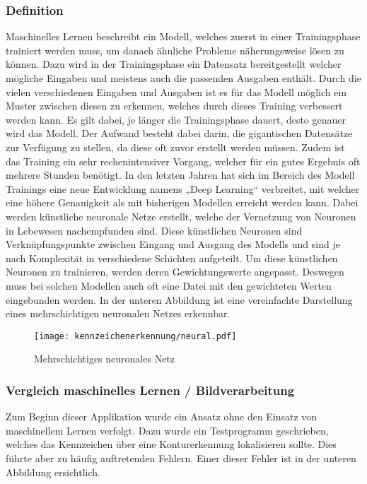\subsubsection{Definition}
Maschinelles Lernen beschreibt ein Modell, welches zuerst in einer Trainingsphase trainiert werden muss, um danach ähnliche Probleme näherungsweise lösen zu können. 
Dazu wird in der Trainingsphase ein Datensatz bereitgestellt welcher mögliche Eingaben und meistens auch die passenden Ausgaben enthält. Durch die vielen verschiedenen 
Eingaben und Ausgaben ist es für das Modell möglich ein Muster zwischen diesen zu erkennen, welches durch dieses Training verbessert werden kann. Es gilt dabei, je 
länger die Trainingsphase dauert, desto genauer wird das Modell. Der Aufwand besteht dabei darin, die gigantischen Datensätze zur Verfügung zu stellen, da diese oft 
zuvor erstellt werden müssen. Zudem ist das Training ein sehr rechenintensiver Vorgang, welcher für ein gutes Ergebnis oft mehrere Stunden benötigt. In den letzten 
Jahren hat sich im Bereich des Modell Trainings eine neue Entwicklung namens „Deep Learning“ verbreitet, mit welcher eine höhere Genauigkeit als mit bisherigen Modellen 
erreicht werden kann. Dabei werden künstliche neuronale Netze erstellt, welche der Vernetzung von Neuronen in Lebewesen nachempfunden sind. Diese künstlichen Neuronen 
sind Verknüpfungspunkte zwischen Eingang und Ausgang des Modells und sind je nach Komplexität in verschiedene Schichten aufgeteilt. Um diese künstlichen Neuronen zu 
trainieren, werden deren Gewichtungswerte angepasst. Deswegen muss bei solchen Modellen auch oft eine Datei mit den gewichteten Werten eingebunden werden. In der unteren Abbildung ist
eine vereinfachte Darstellung eines mehrschichtigen neuronalen Netzes erkennbar.

\begin{figure}[H]
    \centering
    \texttt{[image: kennzeichenerkennung/neural.pdf]}
    \caption{Mehrschichtiges neuronales Netz}
\end{figure}

\subsubsection{Vergleich maschinelles Lernen / Bildverarbeitung}
Zum Beginn dieser Applikation wurde ein Ansatz ohne den Einsatz von maschinellem Lernen verfolgt. Dazu wurde ein Testprogramm geschrieben, welches das Kennzeichen 
über eine Konturerkennung lokalisieren sollte. Dies führte aber zu häufig auftretenden Fehlern. Einer dieser Fehler ist in der unteren Abbildung ersichtlich.

